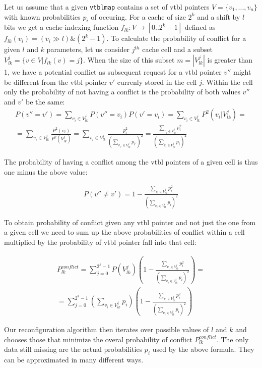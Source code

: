 \documentclass[preprint]{sigplanconf}
\makeatletter
\DeclareRobustCommand{\code}[1]{{\lstinline[breaklines=false,escapechar=@]{#1}}}
\makeatother
\begin{document}
Let us assume that a given \code{vtblmap} contains a set of vtbl pointers 
$V = \{v_1, ... , v_n\}$ with known probabilities $p_i$ of occuring. For a cache 
of size $2^k$ and a shift by $l$ bits we get a cache-indexing function 
$f_{lk} : V \rightarrow [0..2^k-1]$ defined as $f_{lk}(v_i) = (v_i \gg l) \& (2^k-1)$.
To calculate the probability of conflict for a given $l$ and $k$ parameters, let 
us consider $j^{th}$ cache cell and a subset $V^j_{lk}=\{v \in V | f_{lk}(v)=j\}$. 
When the size of this subset $m=|V^j_{lk}|$ is greater than 1, we have a 
potential conflict as subsequent request for a vtbl pointer $v''$ might be 
different from the vtbl pointer $v'$ currenly stored in the cell $j$. Within the 
cell only the probability of not having a conflict is the probability of both 
values $v''$ and $v'$ be the same:
\begin{eqnarray*}
P(v''=v')=\sum\limits_{v_i \in V^j_{lk}}P(v''=v_i)P(v'=v_i)=\sum\limits_{v_i \in V^j_{lk}}P^2(v_i|V^j_{lk})=\\
=\sum\limits_{v_i \in V^j_{lk}}\frac{P^2(v_i)}{P^2(V^j_{lk})}=
\sum\limits_{v_i \in V^j_{lk}}\frac{p_i^2}{(\sum\limits_{v_{i'} \in V^j_{lk}}p_{i'})^2}=
\frac{\sum\limits_{v_i \in V^j_{lk}}p_i^2}{(\sum\limits_{v_{i} \in V^j_{lk}}p_{i})^2}
\end{eqnarray*}

The probability of having a conflict among the vtbl pointers of a given cell is 
thus one minus the above value:

\begin{eqnarray*}
P(v''\neq v')=1-\frac{\sum\limits_{v_i \in V^j_{lk}}p_i^2}{(\sum\limits_{v_{i} \in V^j_{lk}}p_{i})^2}
\end{eqnarray*}

To obtain probability of conflict given any vtbl pointer and not just the one 
from a given cell we need to sum up the above probabilities of conflict within a 
cell multiplied by the probability of vtbl pointer fall into that cell:

\begin{eqnarray*}
P_{lk}^{conflict}=\sum\limits_{j=0}^{2^k-1}P(V^j_{lk})(1-\frac{\sum\limits_{v_i \in V^j_{lk}}p_i^2}{(\sum\limits_{v_{i} \in V^j_{lk}}p_{i})^2})=\\
=\sum\limits_{j=0}^{2^k-1}(\sum\limits_{v_{i} \in V^j_{lk}}p_{i})(1-\frac{\sum\limits_{v_i \in V^j_{lk}}p_i^2}{(\sum\limits_{v_{i} \in V^j_{lk}}p_{i})^2})
\end{eqnarray*}

Our reconfiguration algorithm then iterates over possible values of $l$ and $k$ 
and chooses those that minimize the overal probability of conflict $P_{lk}^{conflict}$.
The only data still missing are the actual probabilities $p_i$ used by the above 
formula. They can be approximated in many different ways.
\end{document}
